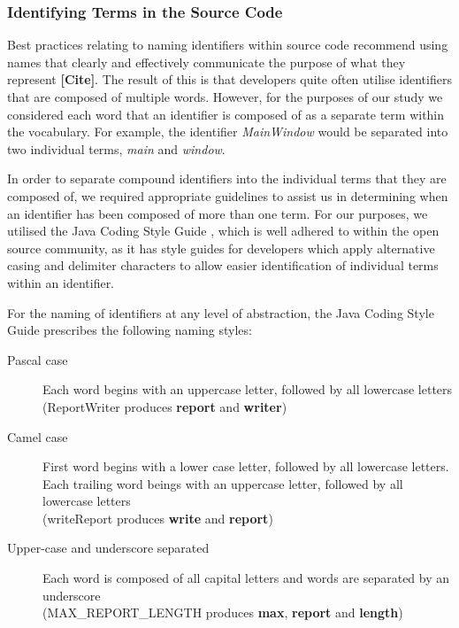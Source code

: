 \subsubsection{Identifying Terms in the Source Code} %
\label{ssub:identifying_terms_in_the_source_code}

Best practices relating to naming identifiers within source code recommend using names that clearly and effectively communicate the purpose of what they represent \textbf{[Cite]}. The result of this is that developers quite often utilise identifiers that are composed of multiple words. However, for the purposes of our study we considered each word that an identifier is composed of as a separate term within the vocabulary. For example, the identifier \emph{MainWindow} would be separated into two individual terms, \emph{main} and \emph{window}. 

In order to separate compound identifiers into the individual terms that they are composed of, we required appropriate guidelines to assist us in determining when an identifier has been composed of more than one term. For our purposes, we utilised the Java Coding Style Guide \cite{Reddy00a}, which is well adhered to within the open source community, as it has style guides for developers which apply alternative casing and delimiter characters to allow easier identification of individual terms within an identifier.

For the naming of identifiers at any level of abstraction, the Java Coding Style Guide prescribes the following naming styles:

\begin{description}
	\item[Pascal case] Each word begins with an uppercase letter, followed by all lowercase letters\\ (\eg ReportWriter produces \textbf{report} and \textbf{writer})
	\item[Camel case] First word begins with a lower case letter, followed by all lowercase letters. Each trailing word beings with an uppercase letter, followed by all lowercase letters\\ (\eg writeReport produces \textbf{write} and \textbf{report})
	\item[Upper-case and underscore separated] Each word is composed of all capital letters and words are separated by an underscore\\ (\eg MAX\_REPORT\_LENGTH produces \textbf{max}, \textbf{report} and \textbf{length})
\end{description}

